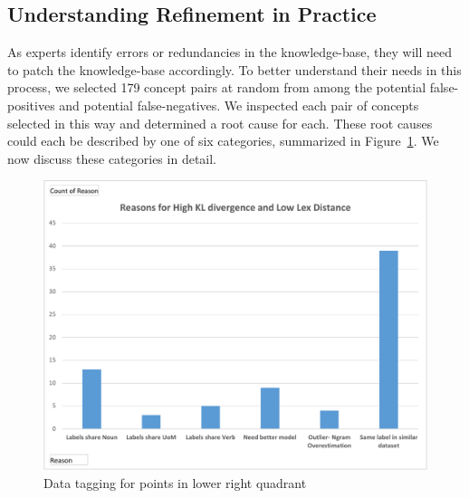 

\subsection{Understanding Refinement in Practice}
As experts identify errors or redundancies in the knowledge-base, they will need to patch the knowledge-base accordingly.
To better understand their needs in this process, we selected 179  concept pairs at random from among the potential false-positives and potential false-negatives.
We inspected each pair of concepts selected in this way and determined a root cause for each.
These root causes could each be described by one of six categories, summarized in Figure~\ref{fig:datatags:lowerright}.
We now discuss these categories in detail.

\begin{figure}
	\centering
	\includegraphics[width=0.8\columnwidth]{graphics/Lower_right_quad}
	\caption{Data tagging for points in lower right quadrant}
	\label{fig:datatags:lowerright}
\end{figure}


